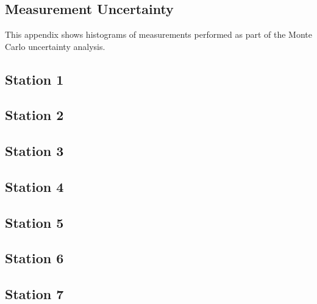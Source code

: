 

\tocless\chapter{}
\section{Measurement Uncertainty}
\label{appendix:uncertainty_histograms}

This appendix shows histograms of measurements performed as part of the Monte 
Carlo uncertainty analysis.

\newpage
\tocless\section{Station 1}



\tocless\section{Station 2}




\makeatletter
{}
\makeatother


\tocless\section{Station 3}



\tocless\section{Station 4}



\makeatletter
{}
\makeatother


\tocless\section{Station 5}



\tocless\section{Station 6}



\tocless\section{Station 7}



